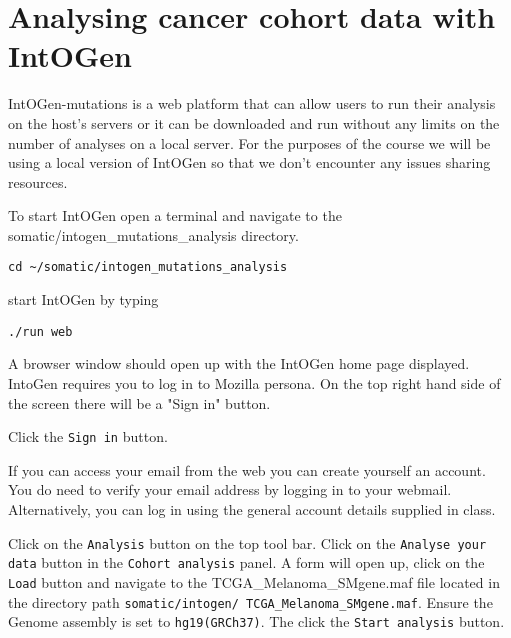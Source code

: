 
\section{Analysing cancer cohort data with IntOGen}

\begin{information}
IntOGen-mutations is a web platform that can allow users to run their analysis on the
host's servers or it can be downloaded and run without any limits on the number of
analyses on a local server.
\vspace{4 mm}
For the purposes of the course we will be using a local version of IntOGen so that we
don't encounter any issues sharing resources.
\end{information}

\begin{steps}
To start IntOGen open a terminal and navigate to the somatic/intogen\_mutations\_analysis directory.
\begin{lstlisting}
cd ~/somatic/intogen_mutations_analysis
\end{lstlisting}
\vspace{4 mm}
start IntOGen by typing
\begin{lstlisting}
./run web
\end{lstlisting}
\end{steps}

\begin{information}
A browser window should open up with the IntOGen home page displayed. 
IntoGen requires you to log in to Mozilla persona.
\vspace{4 mm}
On the top right hand side of the screen there will be a "Sign in" button.
\end{information}

\begin{steps}
Click the \texttt{Sign in} button.
\end{steps}

If you can access your email from the web you can create yourself an account. 
You do need to verify your email address by logging in to your webmail.
\vspace{4 mm}
Alternatively, you can log in using the general account details supplied in class.

\begin{steps}
Click on the \texttt{Analysis} button on the top tool bar. 
Click on the \texttt{Analyse your data} button in the \texttt{Cohort analysis} panel.
\vspace{4 mm}
A form will open up, click on the \texttt{Load} button and navigate to the
TCGA\_Melanoma\_SMgene.maf file located in the directory path 
\texttt{somatic/intogen/ TCGA\_Melanoma\_SMgene.maf}.
\vspace{4 mm}
Ensure the Genome assembly is set to \texttt{hg19(GRCh37)}.
\vspace{4 mm}
The click the \texttt{Start analysis} button.
\end{steps}

